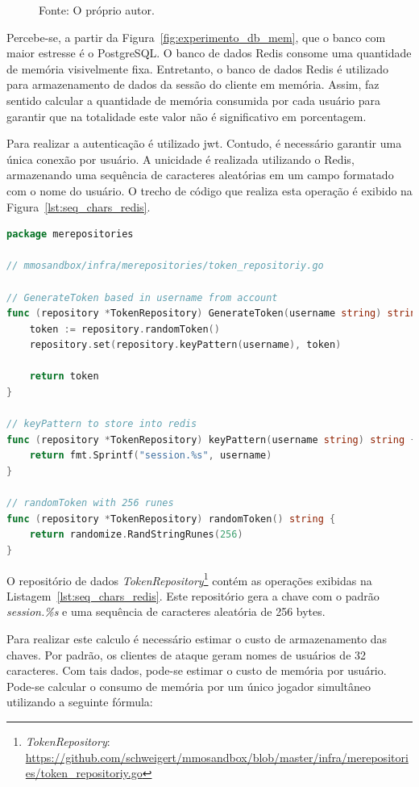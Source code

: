 \begin{figure}[htb!]
    Fonte: O próprio autor.
\end{figure}

Percebe-se, a partir da Figura~\ref{fig:experimento_db_mem}, que o banco com maior estresse é o PostgreSQL.
%
O banco de dados Redis consome uma quantidade de memória visivelmente fixa.
%
Entretanto, o banco de dados Redis é utilizado para armazenamento de dados da sessão do cliente em memória.
%
Assim, faz sentido calcular a quantidade de memória consumida por cada usuário para garantir que na totalidade este valor não é significativo em porcentagem.

Para realizar a autenticação é utilizado \ac{jwt}.
%
Contudo, é necessário garantir uma única conexão por usuário.
%
A unicidade é realizada utilizando o Redis, armazenando uma sequência de caracteres aleatórias em um campo formatado com o nome do usuário.
%
O trecho de código que realiza esta operação é exibido na Figura~\ref{lst:seq_chars_redis}.



\begin{lstlisting}[language=go,firstnumber=1, caption={Informações do Bloco},label={lst:seq_chars_redis}]
package merepositories

// mmosandbox/infra/merepositories/token_repositoriy.go

// GenerateToken based in username from account
func (repository *TokenRepository) GenerateToken(username string) string {
    token := repository.randomToken()
    repository.set(repository.keyPattern(username), token)

    return token
}

// keyPattern to store into redis
func (repository *TokenRepository) keyPattern(username string) string {
    return fmt.Sprintf("session.%s", username)
}

// randomToken with 256 runes
func (repository *TokenRepository) randomToken() string {
    return randomize.RandStringRunes(256)
}
\end{lstlisting}

O repositório de dados \textit{TokenRepository}\footnote{\textit{TokenRepository}: \url{https://github.com/schweigert/mmosandbox/blob/master/infra/merepositories/token_repositoriy.go}} contém as operações exibidas na Listagem~\ref{lst:seq_chars_redis}.
%
Este repositório gera a chave com o padrão \textit{session.\%s} e uma sequência de caracteres aleatória de 256 bytes.

Para realizar este calculo é necessário estimar o custo de armazenamento das chaves.
%
Por padrão, os clientes de ataque geram nomes de usuários de 32 caracteres.
%
Com tais dados, pode-se estimar o custo de memória por usuário.
%
Pode-se calcular o consumo de memória por um único jogador simultâneo utilizando a seguinte fórmula:


